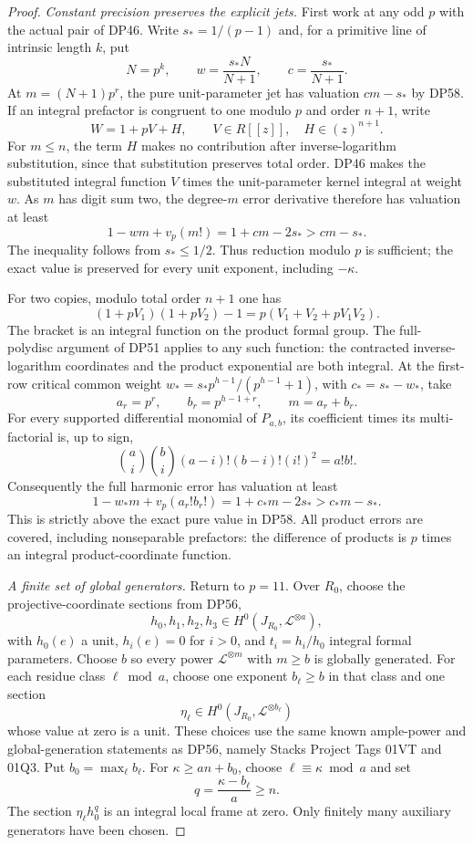 \begin{proof}
\emph{Constant precision preserves the explicit jets.}
First work at any odd $p$ with the actual pair of DP46.
Write $s_*=1/(p-1)$ and, for a primitive line of intrinsic length $k$, put
\[
 N=p^k,\qquad w=\frac{s_*N}{N+1},\qquad
 c=\frac{s_*}{N+1}.
\]
At $m=(N+1)p^r$, the pure unit-parameter jet has valuation $cm-s_*$ by DP58.
If an integral prefactor is congruent to one modulo $p$ and order $n+1$, write
\[
 W=1+pV+H,\qquad V\in R[[z]],\quad H\in(z)^{n+1}.
\]
For $m\le n$, the term $H$ makes no contribution after inverse-logarithm substitution, since that substitution preserves total order.
DP46 makes the substituted integral function $V$ times the unit-parameter kernel integral at weight $w$.
As $m$ has digit sum two, the degree-$m$ error derivative therefore has valuation at least
\[
 1-wm+v_p(m!)=1+cm-2s_*>cm-s_*.
\]
The inequality follows from $s_*\le1/2$.
Thus reduction modulo $p$ is sufficient; the exact value is preserved for every unit exponent, including $-\kappa$.

For two copies, modulo total order $n+1$ one has
\[
 (1+pV_1)(1+pV_2)-1
 =p(V_1+V_2+pV_1V_2).
\]
The bracket is an integral function on the product formal group.
The full-polydisc argument of DP51 applies to any such function: the contracted inverse-logarithm coordinates and the product exponential are both integral.
At the first-row critical common weight
$w_*=s_*p^{h-1}/(p^{h-1}+1)$, with $c_*=s_*-w_*$, take
\[
 a_r=p^r,\qquad b_r=p^{h-1+r},\qquad m=a_r+b_r.
\]
For every supported differential monomial of $P_{a,b}$, its coefficient times its multi-factorial is, up to sign,
\[
 \binom ai\binom bi(a-i)!(b-i)!(i!)^2=a!b!.
\]
Consequently the full harmonic error has valuation at least
\[
 1-w_*m+v_p(a_r!b_r!)
 =1+c_*m-2s_*>c_*m-s_*.
\]
This is strictly above the exact pure value in DP58.
All product errors are covered, including nonseparable prefactors: the difference of products is $p$ times an integral product-coordinate function.

\emph{A finite set of global generators.}
Return to $p=11$.
Over $R_0$, choose the projective-coordinate sections from DP56,
\[
 h_0,h_1,h_2,h_3\in H^0(J_{R_0},\mathcal L^{\otimes a}),
\]
with $h_0(e)$ a unit, $h_i(e)=0$ for $i>0$, and $t_i=h_i/h_0$ integral formal parameters.
Choose $b$ so every power $\mathcal L^{\otimes m}$ with $m\ge b$ is globally generated.
For each residue class $\ell\bmod a$, choose one exponent $b_\ell\ge b$ in that class and one section
\[
 \eta_\ell\in H^0(J_{R_0},\mathcal L^{\otimes b_\ell})
\]
whose value at zero is a unit.
These choices use the same known ample-power and global-generation statements as DP56, namely Stacks Project Tags 01VT and 01Q3.
Put $b_0=\max_\ell b_\ell$.
For $\kappa\ge an+b_0$, choose $\ell\equiv\kappa\bmod a$ and set
\[
 q=\frac{\kappa-b_\ell}{a}\ge n.
\]
The section $\eta_\ell h_0^q$ is an integral local frame at zero.
Only finitely many auxiliary generators have been chosen.


\end{proof}
